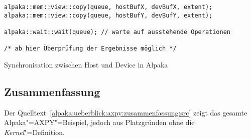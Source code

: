 \begin{code}
    \begin{verbatim}
alpaka::mem::view::copy(queue, hostBufX, devBufX, extent);
alpaka::mem::view::copy(queue, hostBufY, devBufY, extent);

alpaka::wait::wait(queue); // warte auf ausstehende Operationen

/* ab hier Überprüfung der Ergebnisse möglich */
    \end{verbatim}
    \caption{Synchronisation zwischen Host und Device in Alpaka}
    \label{alpaka:ueberblick:axpy:sync:src}
\end{code}

\subsection{Zusammenfassung}
\label{alpaka:ueberblick:axpy:zusammenfassung}

Der Quelltext~\ref{alpaka:ueberblick:axpy:zusammenfassung:src} zeigt das gesamte
Alpaka"=AXPY"=Beispiel, jedoch aus Platzgründen ohne die \textit{Kernel}"=Definition.

